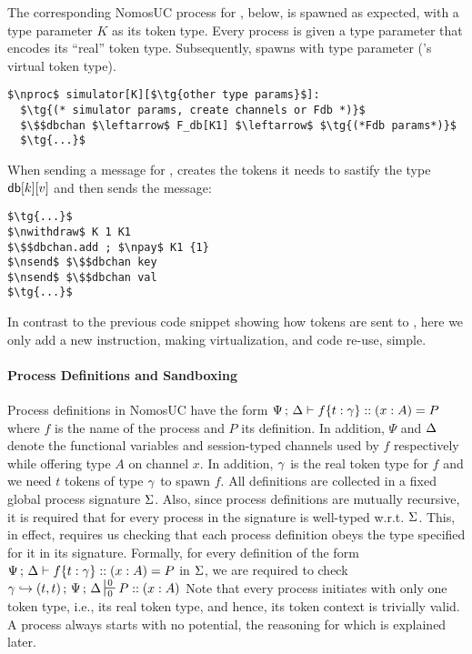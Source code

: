 The corresponding NomosUC process for \Sim, below, is spawned as expected, with a type parameter $K$ as its token type. 
Every process is given a type parameter that encodes its ``real'' token type. 
Subsequently, \Sim spawns \Fdb with type parameter  (\Sim's virtual token type).
\begin{lstlisting}[basicstyle=\footnotesize\BeraMonottFamily, mathescape, frame=single]
$\nproc$ simulator[K][$\tg{other type params}$]:
  $\tg{(* simulator params, create channels or Fdb *)}$
  $\$$dbchan $\leftarrow$ F_db[K1] $\leftarrow$ $\tg{(*Fdb params*)}$
  $\tg{...}$
\end{lstlisting}
When sending a message for \Fdb, \Sim creates the tokens it needs to sastify the type $\mathsf{db}[k][v]$ and then sends the message:
\begin{lstlisting}[basicstyle=\footnotesize\BeraMonottFamily, mathescape, frame=single]
$\tg{...}$
$\nwithdraw$ K 1 K1
$\$$dbchan.add ; $\npay$ K1 {1}
$\nsend$ $\$$dbchan key
$\nsend$ $\$$dbchan val
$\tg{...}$
\end{lstlisting}
In contrast to the previous code snippet showing how tokens are sent to \Fdb, here we only add a new \nwithdraw instruction, making virtualization, and code re-use, simple.

\paragraph*{\textbf{Process Definitions and Sandboxing}}
Process definitions in NomosUC have the form
$\Psi \, ; \, \Delta \vdash f\{t : \gamma\} :: (x : A) = P$ where $f$
is the name of the process and $P$ its definition.
In addition, $\Psi$ and $\Delta$ denote the functional variables and session-typed channels
used by $f$ respectively while offering type $A$ on channel $x$.
In addition, $\gamma$ is the real token type for $f$ and we need $t$ tokens of type $\gamma$
to spawn $f$.
All definitions are collected in a fixed global process signature $\Sigma$.
Also, since process definitions are mutually recursive, it is required that
for every process in the signature is well-typed w.r.t. $\Sigma$.
This, in effect, requires us checking that each process definition obeys the type
specified for it in its signature.
Formally, for every definition of the form $\Psi \, ; \, \Delta \vdash f\{t : \gamma\} :: (x : A) = P$ in $\Sigma$,
we are required to check $\K \hookrightarrow (t, t) \semi \Psi \semi \D \entailpot{0}{0} P :: (x : A)$
Note that every process initiates with only one token type, i.e., its real token type,
and hence, its token context is trivially valid.
A process always starts with no potential, the reasoning for which is explained later.

